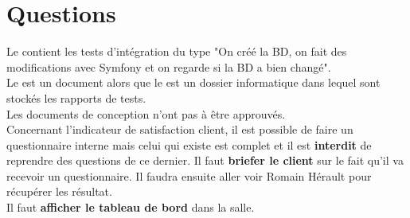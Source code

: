 \documentclass [a4paper] {article}
\begin{document}
\section{Questions}

Le \PTI{} contient les tests d'intégration du type "On créé la BD, on fait des modifications avec Symfony et on regarde si la BD a bien changé".\\

Le \DTU{} est un document alors que le \PTU{} est un dossier informatique dans lequel sont stockés les rapports de tests. \\

Les documents de conception n'ont pas à être approuvés.\\

Concernant l'indicateur de satisfaction client, il est possible de faire un questionnaire interne mais celui qui existe est complet et il est \textbf{interdit} de reprendre des questions de ce dernier. Il faut \textbf{briefer le client} sur le fait qu'il va recevoir un questionnaire. Il faudra ensuite aller voir Romain Hérault pour récupérer les résultat.\\

Il faut \textbf{afficher le tableau de bord} dans la salle.
\end{document}
